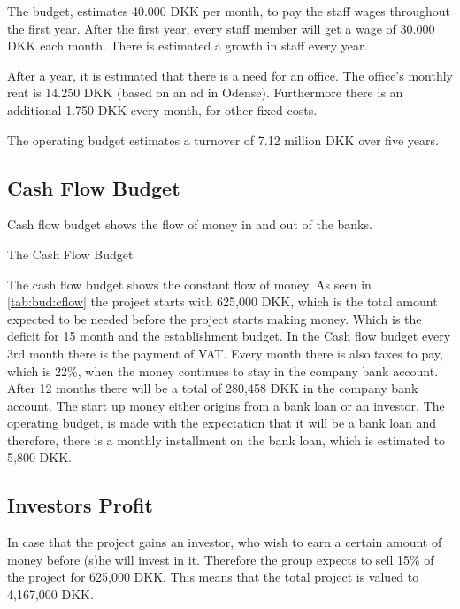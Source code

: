 The budget, estimates 40.000 DKK per month, to pay the staff wages throughout the first year. After the first year, every staff member will get a wage of 30.000 DKK each month. There is estimated a growth in staff every year.

After a year, it is estimated that there is a need for an office. The office’s monthly rent is 14.250 DKK (based on an ad in Odense). Furthermore there is an additional 1.750 DKK every month, for other fixed costs. 

The operating budget estimates a turnover of 7.12 million DKK over five years. 


\subsection{Cash Flow Budget}
Cash flow budget shows the flow of money in and out of the banks.

\begin{table*}[t!]
\centering
\caption{The Cash Flow Budget}
\label{tab:bud:cflow}


\end{table*}

The cash flow budget shows the constant flow of money. As seen in \autoref{tab:bud:cflow} the project starts with 625,000 DKK, which is the total amount expected to be needed before the project starts making money. Which is the deficit for 15 month and the establishment budget. In the Cash flow budget every 3rd month there is the payment of VAT. Every month there is also taxes to pay, which is 22\%, when the money continues to stay in the company bank account. After 12 months there will be a total of 280,458 DKK in the company bank account. The start up money either origins from a bank loan or an investor. The operating budget, is made with the expectation that it will be a bank loan and therefore, there is a monthly installment on the bank loan, which is estimated to 5,800 DKK.


\subsection{Investors Profit}
In case that the project gains an investor, who wish to earn a certain amount of money before (s)he will invest in it. Therefore the group expects to sell 15\% of the project for 625,000 DKK. This means that the total project is valued to 4,167,000 DKK. 

